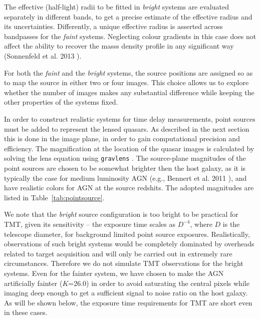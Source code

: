 \documentclass[a4paper,11pt]{article}
\begin{document}
{The effective (half-light) radii to be fitted in \textit{bright}
systems are evaluated separately in different bands, to get a precise
estimate of the effective radius and its uncertainties. Differently, a
unique effective radius is asserted across bandpasses for the
\textit{faint} systems. Neglecting colour gradients in this case does
not affect the ability to recover the masss density profile in any
significant way
(Sonnenfeld et al. 2013 \cite{2013ApJ...777...97S}).

For both the \textit{faint} and the \textit{bright} systems, the source positions are
assigned so as to map the source in either two or four images. This
choice allows us to explore whether the number of images makes any
substantial difference while keeping the other properties of the
systems fixed.

In order to construct realistic systems for time delay measurements,
point sources must be added to represent the lensed quasars. As
described in the next section this is done in the image plane, in
order to gain computational precision and efficiency. The
magnification at the location of the quasar images is calculated by
solving the lens equation using \texttt{gravlens}
\cite{2011ascl.soft02003K}. The source-plane magnitudes of the point
sources are chosen to be somewhat brighter then the host galaxy, as it
is typically the case for medium luminosity AGN
(e.g., Bennert et al. 2011 \cite{2011ApJ...726...59B}), and have realistic colors for AGN at the
source redshits. The adopted magnitudes are listed in
Table~\ref{tab:pointsource}.

We note that the \textit{bright} source configuration is too bright to
be practical for TMT, given its sensitivity -- the exposure time
scales as $D^{-4}$, where $D$ is the telescope diameter, for
background limited point source exposures. Realistically, observations
of such bright systems would be completely dominated by overheads
related to target acquisition and will only be carried out in
extremely rare circumstances. Therefore we do not simulate TMT
observations for the bright systems. Even for the fainter system, we
have chosen to make the AGN artificially fainter
($K$=26.0) in order to avoid saturating the central pixels while
imaging deep enough to get a sufficient signal to noise ratio on the
host galaxy. As will be shown below, the exposure time requirements
for TMT are short even in these cases.

}
\end{document}
